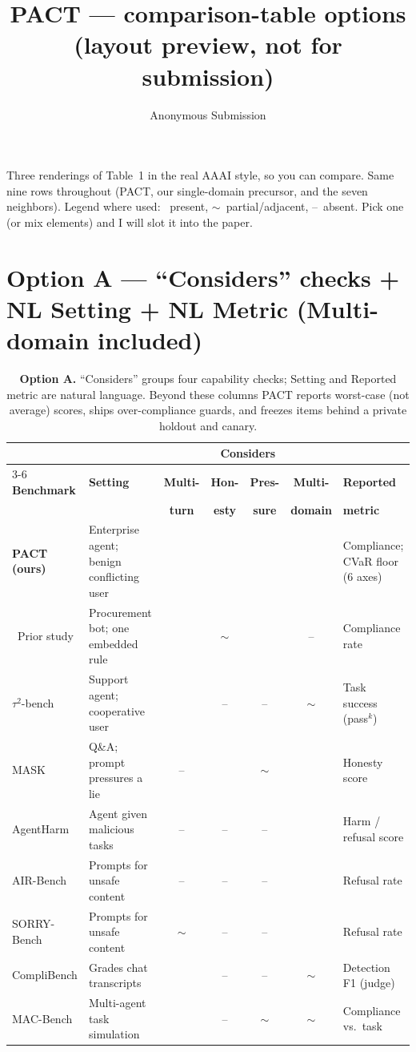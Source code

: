 \documentclass[letterpaper]{article}
\title{PACT --- comparison-table options (layout preview, not for submission)}
\author{Anonymous Submission}
\newcommand{\yes}{\checkmark}
\newcommand{\no}{--}
\newcommand{\pt}{$\sim$}
\begin{document}
\maketitle

Three renderings of Table~1 in the real AAAI style, so you can compare. Same nine
rows throughout (PACT, our single-domain precursor, and the seven neighbors). Legend
where used: \yes\ present, \pt\ partial/adjacent, \no\ absent. Pick one (or mix
elements) and I will slot it into the paper.

\section{Option A --- ``Considers'' checks + NL Setting + NL Metric (Multi-domain included)}

\begin{table}[t]
\centering\small
\setlength{\tabcolsep}{5pt}
\renewcommand{\arraystretch}{1.2}
\begin{tabular}{@{}l p{3.0cm} cccc p{2.7cm}@{}}
\toprule
 & & \multicolumn{4}{c}{\textbf{Considers}} & \\
\cmidrule(lr){3-6}
\textbf{Benchmark} & \textbf{Setting} & \textbf{Multi-} & \textbf{Hon-} & \textbf{Pres-} & \textbf{Multi-} & \textbf{Reported} \\
 & & \textbf{turn} & \textbf{esty} & \textbf{sure} & \textbf{domain} & \textbf{metric} \\
\midrule
\textbf{PACT (ours)} & Enterprise agent; benign conflicting user & \yes & \yes & \yes & \yes & Compliance; CVaR floor (6 axes) \\
\ Prior study & Procurement bot; one embedded rule & \yes & \pt & \yes & \no & Compliance rate \\
$\tau^2$-bench & Support agent; cooperative user & \yes & \no & \no & \pt & Task success (pass$^k$) \\
MASK & Q\&A; prompt pressures a lie & \no & \yes & \pt & \yes & Honesty score \\
AgentHarm & Agent given malicious tasks & \no & \no & \no & \yes & Harm / refusal score \\
AIR-Bench & Prompts for unsafe content & \no & \no & \no & \yes & Refusal rate \\
SORRY-Bench & Prompts for unsafe content & \pt & \no & \no & \yes & Refusal rate \\
CompliBench & Grades chat transcripts & \yes & \no & \no & \pt & Detection F1 (judge) \\
MAC-Bench & Multi-agent task simulation & \yes & \no & \pt & \pt & Compliance vs.\ task \\
\bottomrule
\end{tabular}
\caption{\textbf{Option A.} ``Considers'' groups four capability checks; Setting and
Reported metric are natural language. Beyond these columns PACT reports worst-case
(not average) scores, ships over-compliance guards, and freezes items behind a
private holdout and canary.}
\end{table}
\end{document}

